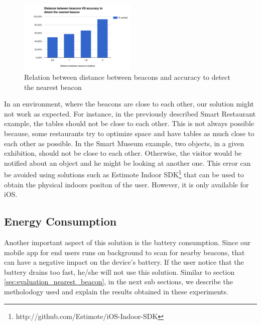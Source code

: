 \begin{figure}[!ht]
  \centering
    \includegraphics[width=0.5\textwidth, keepaspectratio]{figures/results_nearest_beacon}
    \caption[Distance between beacons vs Accuracy]{Relation between distance between beacons and accuracy to detect the nearest beacon}
    \label{fig:results_experiments_nearest_beacon}
\end{figure}

In an environment, where the beacons are close to each other, our solution might not work as expected.
For instance, in the previously described Smart Restaurant example,
the tables should not be close to each other. This is not always possible because, some restaurants try to optimize space and have tables as much close to each other as possible.
In the Smart Museum example, two objects, in a given exhibition, should not be close to each other.
Otherwise, the visitor would be notified about an object and he might be looking at another one.
This error can be avoided using solutions such as Estimote Indoor \gls{SDK}\footnote{http://github.com/Estimote/iOS-Indoor-SDK} that can be used to obtain the physical indoors positon of the user.
However, it is only available for iOS.

\subsection{Energy Consumption}
\label{sec:evaluation_energy_consumption}
Another important aspect of this solution is the battery consumption.
Since our mobile app for end users runs on background to scan for nearby beacons, that can have a negative impact on the device's battery. If the user notice that the battery drains too fast, he/she will not use this solution.
Similar to section \ref{sec:evaluation_nearest_beacon}, in the next sub sections, we describe the metholodogy used and explain the results obtained in these experiments.


